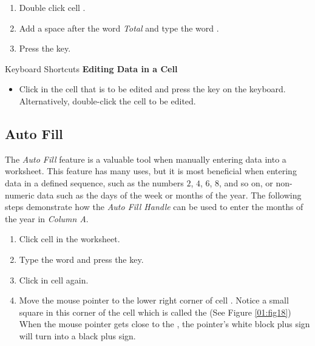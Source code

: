 \begin{enumerate}[resume]
	\item Double click cell .
	\item Add a space after the word \textit{Total} and type the word .
	\item Press the  key.
\end{enumerate}

\begin{center}
	\begin{shtcutbox}{Keyboard Shortcuts}
		\textbf{Editing Data in a Cell}
		\\
		\begin{itemize}
			\setlength{\itemsep}{0pt}
			\setlength{\parskip}{0pt}
			\setlength{\parsep}{0pt}
			
			\item Click in the cell that is to be edited and press the  key on the keyboard. Alternatively, double-click the cell to be edited.
			
		\end{itemize}
	\end{shtcutbox}
\end{center}

\subsection{Auto Fill}

The \textit{Auto Fill} feature is a valuable tool when manually entering data into a worksheet. This feature has many uses, but it is most beneficial when entering data in a defined sequence, such as the numbers $ 2 $, $ 4 $, $ 6 $, $ 8 $, and so on, or non-numeric data such as the days of the week or months of the year. The following steps demonstrate how the \textit{Auto Fill Handle} can be used to enter the months of the year in \textit{Column A}.

\begin{enumerate}
	\item Click cell  in the  worksheet.
	\item Type the word  and press the  key.
	\item Click in cell  again.
	\item Move the mouse pointer to the lower right corner of cell . Notice a small square in this corner of the cell which is called the  (See Figure \ref{01:fig18}) When the mouse pointer gets close to the , the pointer's white block plus sign will turn into a black plus sign.
\end{enumerate}

